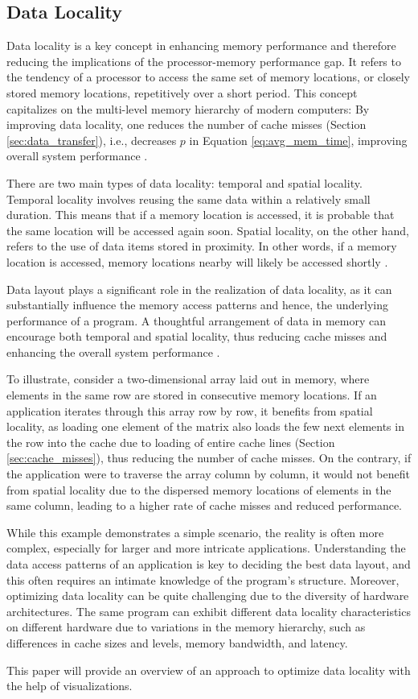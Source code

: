 \subsection{Data Locality}\label{sec:data_locality}
Data locality is a key concept in enhancing memory performance and therefore reducing the implications of the processor-memory performance gap. It refers to the tendency of a processor to access the same set of memory locations, or closely stored memory locations, repetitively over a short period. This concept capitalizes on the multi-level memory hierarchy of modern computers: By improving data locality, one reduces the number of cache misses (Section \ref{sec:data_transfer}), i.e., decreases $p$ in Equation \ref{eq:avg_mem_time}, improving overall system performance \cite{unat2017trends, tate2014programming}.

There are two main types of data locality: temporal and spatial locality. Temporal locality involves reusing the same data within a relatively small duration. This means that if a memory location is accessed, it is probable that the same location will be accessed again soon. Spatial locality, on the other hand, refers to the use of data items stored in proximity. In other words, if a memory location is accessed, memory locations nearby will likely be accessed shortly \cite{esseghir1993improving}.

Data layout plays a significant role in the realization of data locality, as it can substantially influence the memory access patterns and hence, the underlying performance of a program. A thoughtful arrangement of data in memory can encourage both temporal and spatial locality, thus reducing cache misses and enhancing the overall system performance \cite{esseghir1993improving}.

To illustrate, consider a two-dimensional array laid out in memory, where elements in the same row are stored in consecutive memory locations. If an application iterates through this array row by row, it benefits from spatial locality, as loading one element of the matrix also loads the few next elements in the row into the cache due to loading of entire cache lines (Section \ref{sec:cache_misses}), thus reducing the number of cache misses. On the contrary, if the application were to traverse the array column by column, it would not benefit from spatial locality due to the dispersed memory locations of elements in the same column, leading to a higher rate of cache misses and reduced performance.

While this example demonstrates a simple scenario, the reality is often more complex, especially for larger and more intricate applications. Understanding the data access patterns of an application is key to deciding the best data layout, and this often requires an intimate knowledge of the program's structure. Moreover, optimizing data locality can be quite challenging due to the diversity of hardware architectures. The same program can exhibit different data locality characteristics on different hardware due to variations in the memory hierarchy, such as differences in cache sizes and levels, memory bandwidth, and latency.

This paper will provide an overview of an approach to optimize data locality with the help of visualizations.
